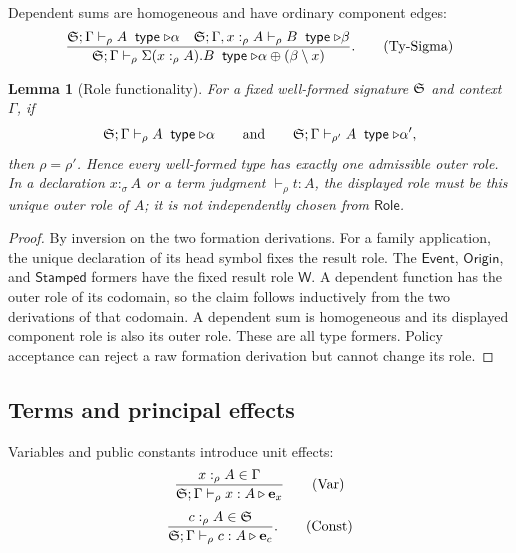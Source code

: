 \documentclass[11pt]{article}
\numberwithin{equation}{section}
\theoremstyle{definition}
\theoremstyle{plain}
\newtheorem{lemma}[definition]{Lemma}
\theoremstyle{remark}
\newcommand{\Event}{\mathsf{Event}}
\newcommand{\Origin}{\mathsf{Origin}}
\newcommand{\Stamped}{\mathsf{Stamped}}
\newcommand{\Role}{\mathsf{Role}}
\newcommand{\Wit}{\mathsf W}
\newcommand{\unit}{\mathbf e}
\newcommand{\jtype}{\mathrel{\mathsf{type}}}
\begin{document}
Dependent sums are homogeneous and have ordinary component edges:
\[
\frac{
 \AFDeclSignature;\Gamma\vdash_{\rho} A\;\jtype\triangleright\alpha
 \quad
 \AFDeclSignature;\Gamma,x:_{\rho}A\vdash_{\rho} B\;\jtype\triangleright\beta
}{
 \AFDeclSignature;\Gamma\vdash_{\rho}\AFDepPair(x:_{\rho}A).B\;\jtype
 \triangleright\alpha\oplus(\beta\setminus x)
}.
\tag{Ty-Sigma}
\]

\begin{lemma}[Role functionality]\label{lem:role-functionality}
For a fixed well-formed signature \({\mathfrak S}\) and context \(\Gamma\), if
\[
 \AFDeclSignature;\Gamma\vdash_{\rho}A\;\jtype\triangleright\alpha
 \qquad\text{and}\qquad
 \AFDeclSignature;\Gamma\vdash_{\rho'}A\;\jtype\triangleright\alpha',
\]
then \(\rho=\rho'\).  Hence every well-formed type has exactly one
admissible outer role.  In a declaration \(x:_{\sigma}A\) or a term judgment
\(\vdash_{\rho}t:A\), the displayed role must be this unique outer role of
\(A\); it is not independently chosen from \(\Role\).
\end{lemma}

\begin{proof}
By inversion on the two formation derivations.  For a family application,
the unique declaration of its head symbol fixes the result role.  The
\(\Event\), \(\Origin\), and \(\Stamped\) formers have the fixed result role
\(\Wit\).  A dependent function has the outer role of its codomain, so the
claim follows inductively from the two derivations of that codomain.  A
dependent sum is homogeneous and its displayed component role is also its
outer role.  These are all type formers.  Policy acceptance can reject a raw
formation derivation but cannot change its role.
\end{proof}

\subsection{Terms and principal effects}\label{sec:term-rules}

Variables and public constants introduce unit effects:
\[
\frac{x:_{\rho}A\in\Gamma}
{\AFDeclSignature;\Gamma\vdash_{\rho} x:A\triangleright\unit_x}
\tag{Var}
\]
\[
\frac{c:_{\rho}A\in\AFDeclSignature}
{\AFDeclSignature;\Gamma\vdash_{\rho} c:A\triangleright\unit_c}.
\tag{Const}
\]
\end{document}
